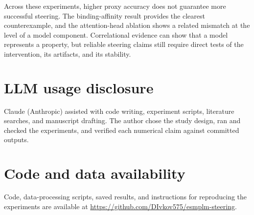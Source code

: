 \documentclass{article}
\begin{document}
Across these experiments, higher proxy accuracy does not guarantee more
successful steering. The binding-affinity result provides the clearest
counterexample, and the attention-head ablation shows a related mismatch
at the level of a model component. Correlational evidence can show that a
model represents a property, but reliable steering claims still require
direct tests of the intervention, its artifacts, and its stability.

\section*{LLM usage disclosure}
Claude (Anthropic) assisted with code writing, experiment scripts,
literature searches, and manuscript drafting. The author chose the study
design, ran and checked the experiments, and verified each numerical
claim against committed outputs.

\section*{Code and data availability}
Code, data-processing scripts, saved results, and instructions for
reproducing the experiments are available at
\url{https://github.com/DIvkov575/esmplm-steering}.



\end{document}
